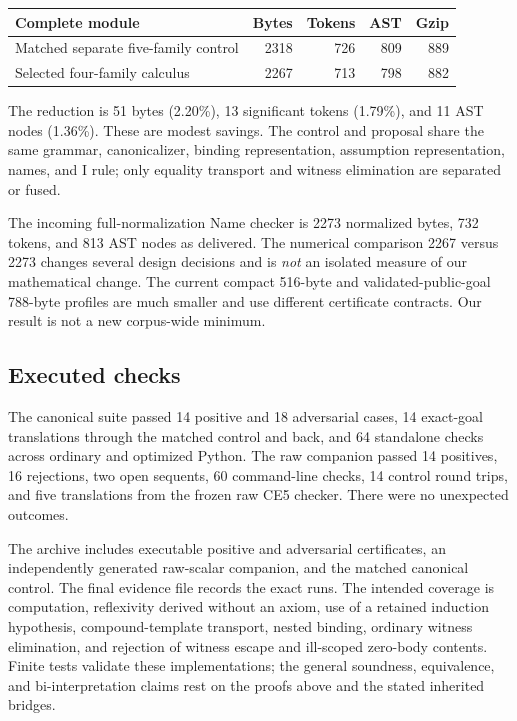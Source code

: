 \documentclass[11pt]{article}
\theoremstyle{definition}\newtheorem{definition}[theorem]{Definition}
\begin{document}
\begin{center}\small
\begin{tabular}{lrrrr}
\toprule
Complete module & Bytes & Tokens & AST & Gzip\\
\midrule
Matched separate five-family control & 2318 & 726 & 809 & 889\\
Selected four-family calculus & 2267 & 713 & 798 & 882\\
\bottomrule
\end{tabular}
\end{center}
The reduction is 51 bytes (2.20\%), 13 significant tokens (1.79\%),
and 11 AST nodes (1.36\%). These are modest savings. The control and
proposal share the same grammar, canonicalizer, binding representation,
assumption representation, names, and I rule; only equality transport
and witness elimination are separated or fused.

The incoming full-normalization Name checker is 2273 normalized bytes,
732 tokens, and 813 AST nodes as delivered. The numerical comparison
2267 versus 2273 changes several design decisions and is \emph{not}
an isolated measure of our mathematical change. The current compact
516-byte and validated-public-goal 788-byte profiles are much smaller
and use different certificate contracts. Our result is not a new
corpus-wide minimum.

\subsection{Executed checks}

The canonical suite passed 14 positive and 18 adversarial cases, 14
exact-goal translations through the matched control and back, and 64
standalone checks across ordinary and optimized Python. The raw companion
passed 14 positives, 16 rejections, two open sequents, 60 command-line
checks, 14 control round trips, and five translations from the frozen
raw CE5 checker. There were no unexpected outcomes.

The archive includes executable positive and adversarial certificates,
an independently generated raw-scalar companion, and the matched
canonical control. The final evidence file records the exact runs.
The intended coverage is computation, reflexivity derived without an
axiom, use of a retained induction hypothesis, compound-template
transport, nested binding, ordinary witness elimination, and rejection
of witness escape and ill-scoped zero-body contents. Finite tests
validate these implementations; the general soundness, equivalence,
and bi-interpretation claims rest on the proofs above and the stated
inherited bridges.
\end{document}
